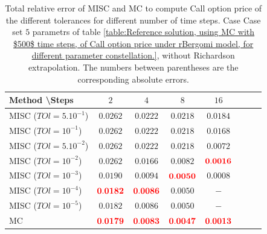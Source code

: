 \documentclass[11pt]{article}
\begin{document}
\begin{table}[h!]
	\centering
	\begin{tabular}{l*{6}{c}r}
		Method \textbackslash  Steps            & $2$ & $4$ & $8$ & $16$  \\
		\hline
		MISC ($TOl=5.10^{-1}$)  & $\mathbf{0.0262}$ & $\mathbf{0.0222}$ & $\mathbf{ 0.0218}$ & $\mathbf{ 0.0184}$  \\
		MISC ($TOl=10^{-1}$)  &  $\mathbf{0.0262}$ & $\mathbf{0.0222}$& $\mathbf{ 0.0218}$ & $\mathbf{ 0.0168}$   \\
		MISC ($TOl=5.10^{-2}$)  & $\mathbf{0.0262}$ & $\mathbf{0.0222}$ & $\mathbf{ 0.0218}$ & $\mathbf{ 0.0072}$  \\
		MISC ($TOl=10^{-2}$)  &  $\mathbf{0.0262}$ & $\mathbf{0.0166}$& $\mathbf{ 0.0082}$ & $\mathbf{ {\color{red}0.0016}}$  \\
		MISC ($TOl=10^{-3}$)  &  $\mathbf{0.0190}$ & $\mathbf{0.0094}$& $\mathbf{{\color{red}0.0050}}$  & $\mathbf{ 0.0008}$  \\
		MISC ($TOl=10^{-4}$)  &  $\mathbf{{\color{red}0.0182}}$ & $\mathbf{{\color{red}0.0086}}$& $\mathbf{0.0050}$ & $\mathbf{ -}$ \\
			MISC ($TOl=10^{-5}$)  &  $\mathbf{0.0182}$ & $\mathbf{0.0086}$& $\mathbf{0.0050}$ & $\mathbf{ -}$ 
			 \\
		\hline
		MC    & $\mathbf{{\color{red}0.0179}}$  & $\mathbf{ {\color{red}0.0083}}$  & $\mathbf{{\color{red}0.0047}}$ & $\mathbf{ {\color{red}0.0013}}$  \\		
		\hline
	\end{tabular}
	\caption{Total relative error of MISC and MC to compute Call option price of the different tolerances for different number of time steps. Case Case set $5$ parametrs of table \ref{table:Reference solution, using MC with $500$ time steps, of Call option price under rBergomi model, for different parameter constellation.}, without Richardson extrapolation. The numbers between parentheses are the corresponding absolute errors.}
	\label{Total error of MISC and MC to compute Call option price of the different tolerances for different number of time steps. Case set 5, without Richardson extrapolation. The numbers between parentheses are the corresponding absolute errors.}
\end{table}
\end{document}
